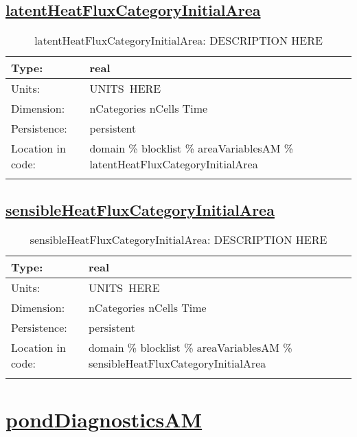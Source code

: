\subsection[latentHeatFluxCategoryInitialArea]{\hyperref[sec:var_tab_areaVariablesAM]{latentHeatFluxCategoryInitialArea}}
\label{subsec:var_sec_areaVariablesAM_latentHeatFluxCategoryInitialArea}
\begin{center}
\begin{longtable}{| p{2.0in} | p{4.0in} |}
        \hline 
        Type: & real \\
        \hline 
        Units: & \si{UNITS.HERE} \\
        \hline 
        Dimension: & nCategories nCells Time \\
        \hline 
        Persistence: & persistent \\
        \hline 
         Location in code: & domain \% blocklist \% areaVariablesAM \% latentHeatFluxCategoryInitialArea \\
         \hline 
    \caption{latentHeatFluxCategoryInitialArea: DESCRIPTION HERE}
\end{longtable}
\end{center}
\subsection[sensibleHeatFluxCategoryInitialArea]{\hyperref[sec:var_tab_areaVariablesAM]{sensibleHeatFluxCategoryInitialArea}}
\label{subsec:var_sec_areaVariablesAM_sensibleHeatFluxCategoryInitialArea}
\begin{center}
\begin{longtable}{| p{2.0in} | p{4.0in} |}
        \hline 
        Type: & real \\
        \hline 
        Units: & \si{UNITS.HERE} \\
        \hline 
        Dimension: & nCategories nCells Time \\
        \hline 
        Persistence: & persistent \\
        \hline 
         Location in code: & domain \% blocklist \% areaVariablesAM \% sensibleHeatFluxCategoryInitialArea \\
         \hline 
    \caption{sensibleHeatFluxCategoryInitialArea: DESCRIPTION HERE}
\end{longtable}
\end{center}
\section[pondDiagnosticsAM]{\hyperref[sec:var_tab_pondDiagnosticsAM]{pondDiagnosticsAM}}
\label{sec:var_sec_pondDiagnosticsAM}
